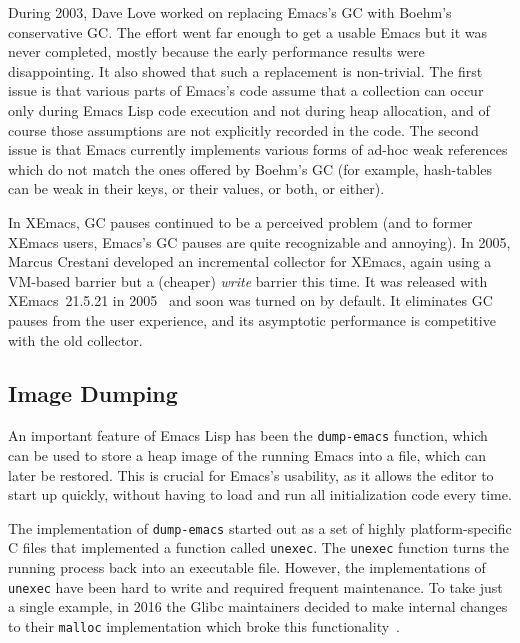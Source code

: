 \documentclass[format=acmsmall,screen]{acmart}
\newcommand \Elisp {Emacs Lisp}
\begin{document}
During 2003, Dave Love worked on replacing Emacs's GC with Boehm's
conservative GC.  The effort went far enough to get a usable Emacs but it
was never completed, mostly because the early performance results were
disappointing.  It also showed that such a replacement is non-trivial.
The first issue is that various parts of Emacs's code assume that
a collection can occur only during \Elisp{} code execution and not during
heap allocation, and of course those assumptions are not explicitly recorded
in the code.  The second issue is that Emacs currently implements various
forms of ad-hoc weak references which do not match the ones
offered by Boehm's GC (for example, hash-tables can be weak in their keys,
or their values, or both, or either).

\label{sec:incremental-gc}
In XEmacs, GC pauses continued to be a perceived problem (and to
former XEmacs users, Emacs's GC pauses are quite recognizable and
annoying).
In 2005, Marcus Crestani developed an incremental collector for XEmacs,
again using a VM-based barrier but a (cheaper) \emph{write} barrier this time.
It was released with XEmacs~21.5.21 in
2005~\cite{Crestani2005} and soon was turned on by default.  It
eliminates GC pauses from the user experience, and its asymptotic
performance is competitive with the old collector.

\subsection{Image Dumping}
\label{sec:image-dumping}

An important feature of \Elisp{} has been the \texttt{dump-emacs}
function, which can be used to store a heap image of the running Emacs
into a file, which can later be restored.  This is crucial for Emacs's
usability, as it allows the editor to start up quickly, without
having to load and run all initialization code every time.

The implementation of \texttt{dump-emacs} started out as a set of highly
platform-specific C files that implemented a function called
\texttt{unexec}.  The \texttt{unexec} function turns the running process
back into an executable file.  However, the implementations of
\texttt{unexec} have been hard to write and required frequent maintenance.
To take just a single example, in 2016 the Glibc maintainers decided to make
internal changes to their \texttt{malloc} implementation which broke this
functionality~\cite{UnexecGlibc}.
\end{document}
